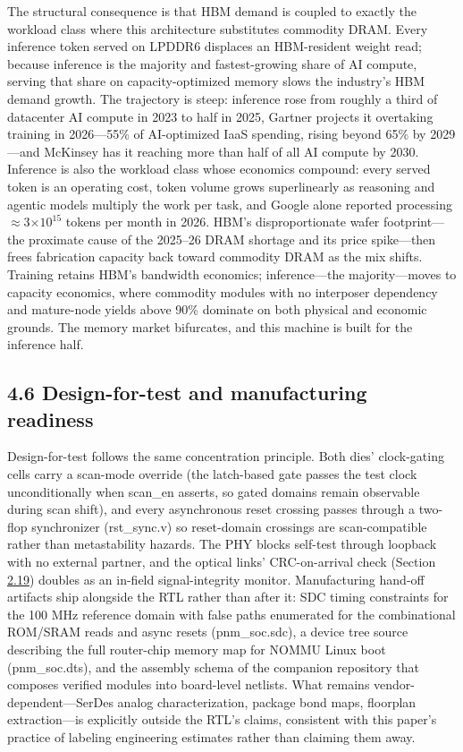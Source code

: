\documentclass[10pt,twocolumn]{article}
\begin{document}
The structural consequence is that HBM demand is coupled to exactly the workload class where this architecture substitutes commodity DRAM. Every inference token served on LPDDR6 displaces an HBM-resident weight read; because inference is the majority and fastest-growing share of AI compute\cite{21,22,23}, serving that share on capacity-optimized memory slows the industry's HBM demand growth. The trajectory is steep: inference rose from roughly a third of datacenter AI compute in 2023 to half in 2025\cite{21}, Gartner projects it overtaking training in 2026---55\% of AI-optimized IaaS spending, rising beyond 65\% by 2029\cite{22}---and McKinsey has it reaching more than half of all AI compute by 2030\cite{23}. Inference is also the workload class whose economics compound: every served token is an operating cost, token volume grows superlinearly as reasoning and agentic models multiply the work per task, and Google alone reported processing $\approx$3$\times10^{15}$ tokens per month in 2026\cite{24}. HBM's disproportionate wafer footprint---the proximate cause of the 2025--26 DRAM shortage and its price spike\cite{25}---then frees fabrication capacity back toward commodity DRAM as the mix shifts. Training retains HBM's bandwidth economics; inference---the majority---moves to capacity economics, where commodity modules with no interposer dependency and mature-node yields above 90\% dominate on both physical and economic grounds. The memory market bifurcates, and this machine is built for the inference half.

\subsection*{4.6 Design-for-test and manufacturing readiness}\label{sec:4.6}


Design-for-test follows the same concentration principle. Both dies' clock-gating cells carry a scan-mode override (the latch-based gate passes the test clock unconditionally when scan\_en asserts, so gated domains remain observable during scan shift), and every asynchronous reset crossing passes through a two-flop synchronizer (rst\_sync.v) so reset-domain crossings are scan-compatible rather than metastability hazards. The PHY blocks self-test through loopback with no external partner, and the optical links' CRC-on-arrival check (Section \hyperref[sec:2.19]{2.19}) doubles as an in-field signal-integrity monitor. Manufacturing hand-off artifacts ship alongside the RTL rather than after it: SDC timing constraints for the 100 MHz reference domain with false paths enumerated for the combinational ROM/SRAM reads and async resets (pnm\_soc.sdc), a device tree source describing the full router-chip memory map for NOMMU Linux boot (pnm\_soc.dts), and the assembly schema of the companion repository that composes verified modules into board-level netlists. What remains vendor-dependent---SerDes analog characterization, package bond maps, floorplan extraction---is explicitly outside the RTL's claims, consistent with this paper's practice of labeling engineering estimates rather than claiming them away.
\end{document}

